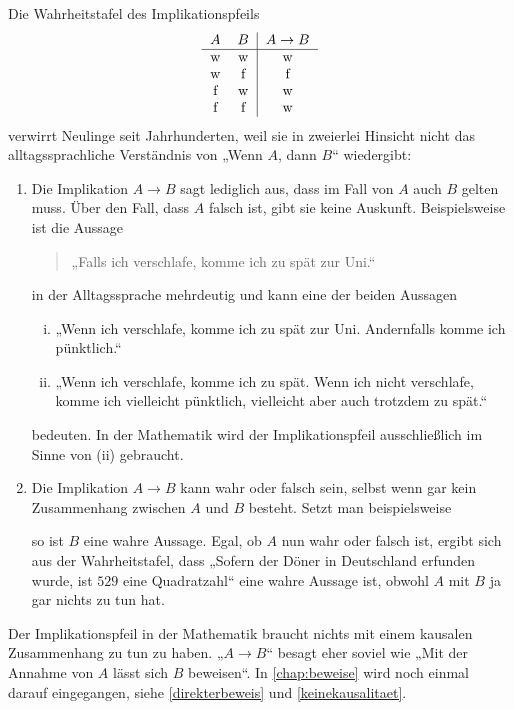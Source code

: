 \begin{bem}
    Die Wahrheitstafel des Implikationspfeils
    \[\begin{tabular}{cc|c}
        $A$ & $B$ &  $A\to B$  \\
        \hline
        w&w& w\\
        w&f& f\\
        f&w& w\\
        f&f& w\\
    \end{tabular}\]
    verwirrt Neulinge seit Jahrhunderten, weil sie in zweierlei Hinsicht nicht das alltagssprachliche Verständnis von „Wenn $A$, dann $B$“ wiedergibt:
    \begin{enumerate}[1.]
        \item Die Implikation $A\to B$ sagt lediglich aus, dass im Fall von $A$ auch $B$ gelten muss. Über den Fall, dass $A$ falsch ist, gibt sie keine Auskunft. Beispielsweise ist die Aussage
        \begin{quote}
            „Falls ich verschlafe, komme ich zu spät zur Uni.“
        \end{quote}
        in der Alltagssprache mehrdeutig und kann eine der beiden Aussagen
        \begin{enumerate}[(i)]
            \item „Wenn ich verschlafe, komme ich zu spät zur Uni. Andernfalls komme ich pünktlich.“
            \item „Wenn ich verschlafe, komme ich zu spät. Wenn ich nicht verschlafe, komme ich vielleicht pünktlich, vielleicht aber auch trotzdem zu spät.“
        \end{enumerate}
        bedeuten. In der Mathematik wird der Implikationspfeil ausschließlich im Sinne von (ii) gebraucht.
        \item Die Implikation $A\to B$ kann wahr oder falsch sein, selbst wenn gar kein Zusammenhang zwischen $A$ und $B$ besteht. Setzt man beispielsweise
        so ist $B$ eine wahre Aussage. Egal, ob $A$ nun wahr oder falsch ist, ergibt sich aus der Wahrheitstafel, dass „Sofern der Döner in Deutschland erfunden wurde, ist $529$ eine Quadratzahl“ eine wahre Aussage ist, obwohl $A$ mit $B$ ja gar nichts zu tun hat.
    \end{enumerate}
    Der Implikationspfeil in der Mathematik braucht nichts mit einem kausalen Zusammenhang zu tun zu haben. „$A\to B$“ besagt eher soviel wie „Mit der Annahme von $A$ lässt sich $B$ beweisen“. In \cref{chap:beweise} wird noch einmal darauf eingegangen, siehe \cref{direkterbeweis} und \cref{keinekausalitaet}.
\end{bem}





